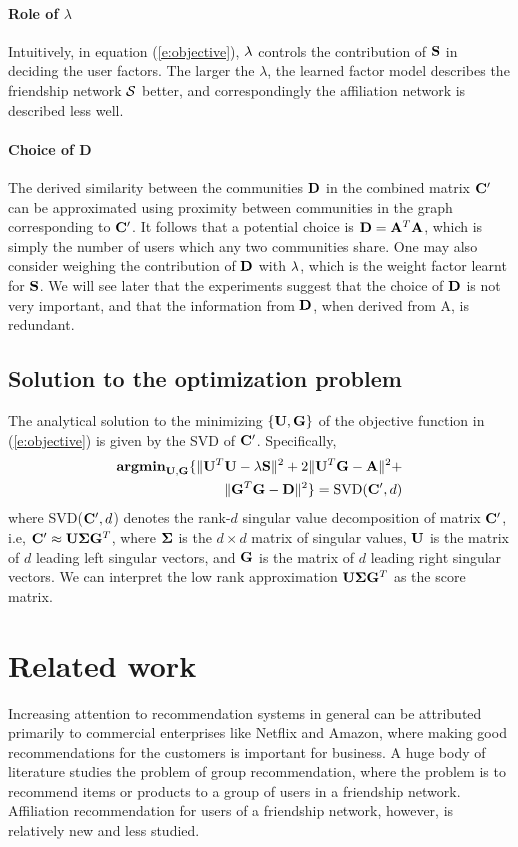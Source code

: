 \documentclass{sig-alternate}
\begin{document}
\paragraph*{Role of $\lambda$}
Intuitively, in equation (\ref{e:objective}), $\lambda$ controls the contribution of $\mathbf{S}$ in deciding the user factors. The larger the $\lambda$, the learned factor model describes the friendship network $\mathcal{S}$ better, and correspondingly the affiliation network is described less well.

\paragraph*{Choice of D}
The derived similarity between the communities $\mathbf{D}$ in the combined matrix $\mathbf{C}'$ can be approximated using proximity between communities in the graph corresponding to $\mathbf{C}'$. It follows that a potential choice is $\mathbf{D} = \mathbf{A}^T \mathbf{A}$, which is simply the number of users which any two communities share. One may also consider weighing the contribution of $\mathbf{D}$ with $\lambda$, which is the weight factor learnt for $\mathbf{S}$. We will see later that the experiments suggest that the choice of $\mathbf{D}$ is not very important, and that the information from $\mathbf{D}$, when derived from A, is redundant.

\subsection{Solution to the optimization problem}
The analytical solution to the minimizing $\left\{ \mathbf{U}, \mathbf{G} \right\}$ of the objective function in (\ref{e:objective}) is given by the SVD of $\mathbf{C}'$. Specifically,
\begin{eqnarray}
 \textbf{argmin}_{\mathbf{U}, \mathbf{G}} \{\|\mathbf{U}^T \mathbf{U} -\lambda \mathbf{S} \|^2 + 2\|\mathbf{U}^T \mathbf{G} -\mathbf{A} \|^2 + \nonumber\\ \|\mathbf{G}^T\mathbf{G} - \mathbf{D}\|^2 \} =  \text{SVD}(\mathbf{C}', d)
\end{eqnarray}
where SVD($\mathbf{C}', d$) denotes the rank-$d$ singular value decomposition of matrix $\mathbf{C}'$, i.e, $\mathbf{C}' \approx \mathbf{U} \boldsymbol{\Sigma} \mathbf{G}^T$, where
$\boldsymbol{\Sigma}$ is the $d \times d$ matrix of singular values, $\mathbf{U}$ is the matrix of $d$ leading left singular vectors, and $\mathbf{G}$ is the matrix of $d$ leading right singular vectors. We can interpret the low rank approximation $\mathbf{U} \boldsymbol{\Sigma} \mathbf{G}^T$ as the score matrix.


\section{Related work}
\label{Related work}
Increasing attention to recommendation systems in general can be attributed primarily to commercial enterprises like Netflix and Amazon, where making good recommendations for the customers is important for business. A huge body of literature studies the problem of group recommendation, where the problem is to recommend items or products to a group of users in a friendship network.  Affiliation recommendation for users of a friendship network, however, is relatively new and less studied.
\end{document}
